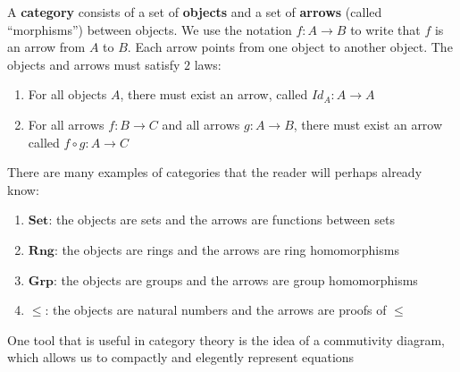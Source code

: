 \documentclass[14pt]{extarticle}  %
\begin{document}
\begin{defn}
  A \textbf{category} consists of a set of \textbf{objects} and a set of \textbf{arrows} (called ``morphisms'') between objects. We use the notation $f : A \to B$ to write that $f$
  is an arrow from $A$ to $B$. Each arrow points from one
  object to another object. The objects and arrows must satisfy $2$ laws:
  \begin{enumerate}
    \item For all objects $A$, there must exist an arrow, called $Id_{A} : A \to A$
    \item For all arrows $f: B \to  C$ and all arrows $g : A \to B$, there must exist an arrow called $f \circ g : A \to C$
\end{enumerate}
\end{defn}

\begin{ex}
  There are many examples of categories that the reader will perhaps already know:
  \begin{enumerate}
    \item $\textbf{Set}$: the objects are sets and the arrows are functions between sets
    \item $\textbf{Rng}$: the objects are rings and the arrows are ring homomorphisms
    \item $\textbf{Grp}$: the objects are groups and the arrows are group homomorphisms
    \item $\le$: the objects are natural numbers and the arrows are proofs of $\le$
    \end{enumerate}
\end{ex}


One tool that is useful in category theory is the idea of a commutivity diagram, which allows us to compactly and elegently represent equations
\end{document}
